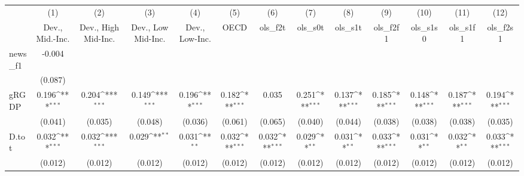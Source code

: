 {
\def\sym#1{\ifmmode^{#1}\else\(^{#1}\)\fi}
\begin{tabular}{l*{12}{c}}
\toprule
            &\multicolumn{1}{c}{(1)}&\multicolumn{1}{c}{(2)}&\multicolumn{1}{c}{(3)}&\multicolumn{1}{c}{(4)}&\multicolumn{1}{c}{(5)}&\multicolumn{1}{c}{(6)}&\multicolumn{1}{c}{(7)}&\multicolumn{1}{c}{(8)}&\multicolumn{1}{c}{(9)}&\multicolumn{1}{c}{(10)}&\multicolumn{1}{c}{(11)}&\multicolumn{1}{c}{(12)}\\
            &\multicolumn{1}{c}{Dev., Mid.-Inc.}&\multicolumn{1}{c}{Dev., High Mid-Inc.}&\multicolumn{1}{c}{Dev., Low Mid-Inc.}&\multicolumn{1}{c}{Dev., Low-Inc.}&\multicolumn{1}{c}{OECD}&\multicolumn{1}{c}{ols\_f2t}&\multicolumn{1}{c}{ols\_s0t}&\multicolumn{1}{c}{ols\_s1t}&\multicolumn{1}{c}{ols\_f2f1}&\multicolumn{1}{c}{ols\_s1s0}&\multicolumn{1}{c}{ols\_s1f1}&\multicolumn{1}{c}{ols\_f2s1}\\
\midrule
news\_f1     &      -0.004         &                     &                     &                     &                     &                     &                     &                     &                     &                     &                     &                     \\
            &     (0.087)         &                     &                     &                     &                     &                     &                     &                     &                     &                     &                     &                     \\
\addlinespace
gRGDP       &       0.196\sym{***}&       0.204\sym{***}&       0.149\sym{***}&       0.196\sym{***}&       0.182\sym{***}&       0.035         &       0.251\sym{***}&       0.137\sym{***}&       0.185\sym{***}&       0.148\sym{***}&       0.187\sym{***}&       0.194\sym{***}\\
            &     (0.041)         &     (0.035)         &     (0.048)         &     (0.036)         &     (0.061)         &     (0.065)         &     (0.040)         &     (0.044)         &     (0.038)         &     (0.038)         &     (0.038)         &     (0.035)         \\
\addlinespace
D.tot       &       0.032\sym{***}&       0.032\sym{***}&       0.029\sym{**} &       0.031\sym{**} &       0.032\sym{***}&       0.032\sym{***}&       0.029\sym{**} &       0.031\sym{**} &       0.033\sym{***}&       0.031\sym{**} &       0.032\sym{**} &       0.033\sym{***}\\
            &     (0.012)         &     (0.012)         &     (0.012)         &     (0.012)         &     (0.012)         &     (0.012)         &     (0.012)         &     (0.012)         &     (0.012)         &     (0.012)         &     (0.012)         &     (0.012)         \\

\end{tabular}}
